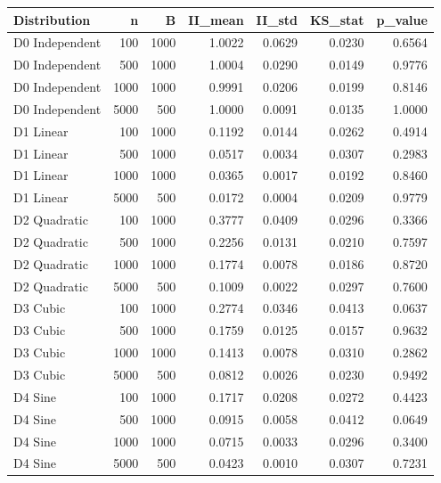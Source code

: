 
\begin{tabular}{lrrrrrr}
\toprule
   Distribution &     n &     B &  II\_mean &  II\_std &  KS\_stat &  p\_value \\
\midrule
 D0 Independent &   100 &  1000 &   1.0022 &  0.0629 &   0.0230 &   0.6564 \\
 D0 Independent &   500 &  1000 &   1.0004 &  0.0290 &   0.0149 &   0.9776 \\
 D0 Independent &  1000 &  1000 &   0.9991 &  0.0206 &   0.0199 &   0.8146 \\
 D0 Independent &  5000 &   500 &   1.0000 &  0.0091 &   0.0135 &   1.0000 \\
      D1 Linear &   100 &  1000 &   0.1192 &  0.0144 &   0.0262 &   0.4914 \\
      D1 Linear &   500 &  1000 &   0.0517 &  0.0034 &   0.0307 &   0.2983 \\
      D1 Linear &  1000 &  1000 &   0.0365 &  0.0017 &   0.0192 &   0.8460 \\
      D1 Linear &  5000 &   500 &   0.0172 &  0.0004 &   0.0209 &   0.9779 \\
   D2 Quadratic &   100 &  1000 &   0.3777 &  0.0409 &   0.0296 &   0.3366 \\
   D2 Quadratic &   500 &  1000 &   0.2256 &  0.0131 &   0.0210 &   0.7597 \\
   D2 Quadratic &  1000 &  1000 &   0.1774 &  0.0078 &   0.0186 &   0.8720 \\
   D2 Quadratic &  5000 &   500 &   0.1009 &  0.0022 &   0.0297 &   0.7600 \\
       D3 Cubic &   100 &  1000 &   0.2774 &  0.0346 &   0.0413 &   0.0637 \\
       D3 Cubic &   500 &  1000 &   0.1759 &  0.0125 &   0.0157 &   0.9632 \\
       D3 Cubic &  1000 &  1000 &   0.1413 &  0.0078 &   0.0310 &   0.2862 \\
       D3 Cubic &  5000 &   500 &   0.0812 &  0.0026 &   0.0230 &   0.9492 \\
        D4 Sine &   100 &  1000 &   0.1717 &  0.0208 &   0.0272 &   0.4423 \\
        D4 Sine &   500 &  1000 &   0.0915 &  0.0058 &   0.0412 &   0.0649 \\
        D4 Sine &  1000 &  1000 &   0.0715 &  0.0033 &   0.0296 &   0.3400 \\
        D4 Sine &  5000 &   500 &   0.0423 &  0.0010 &   0.0307 &   0.7231 \\

\end{tabular}
